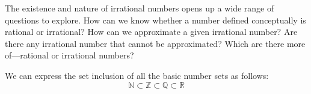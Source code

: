\begin{advancedTopic}
  The existence and nature of irrational numbers opens up a wide range of questions to explore. How can we know
  whether a number defined conceptually is rational or irrational? How can we approximate a given irrational
  number? Are there any irrational number that cannot be approximated? Which are there more of—rational or
  irrational numbers?
\end{advancedTopic}

We can express the set inclusion of all the basic number sets as follows:
\[
  \mathbb{N} \subset \mathbb{Z} \subset \mathbb{Q} \subset \mathbb{R}
\]
